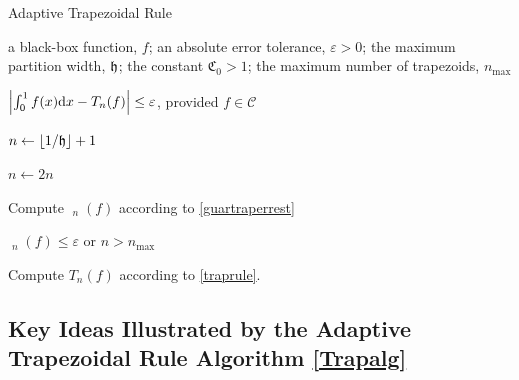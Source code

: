 \documentclass[11pt]{NSFamsart}
\newcommand{\hcut}{\frak{h}}
\DeclareMathOperator{\err}{err}
\DeclareMathOperator{\herr}{\widehat{\err}}
\def\dif{\textup{d}}
\newcommand{\cc}{\mathcal{C}}
\newcommand{\fC}{\mathfrak{C}}
\def\abs#1{\ensuremath{\left \lvert #1 \right \rvert}}
\begin{document}
\begin{algorithm}
	\caption{Adaptive Trapezoidal Rule \label{Trapalg}} 
	\begin{algorithmic}[1]
		\REQUIRE a black-box function, $f$; an absolute error tolerance,
		$\varepsilon>0$; the maximum partition width, $\hcut$; the constant $\fC_0 > 1$;  the 
		maximum number of trapezoids, $n_{\max}$

\ENSURE $\abs{\int_0^1 f(x) \dif x - T_n(f)} \le \varepsilon$, provided $f \in \cc$

\STATE $n \leftarrow \lfloor 1 /\hcut \rfloor + 1$

\REPEAT

\STATE $n \leftarrow 2n$

\STATE Compute $\herr_n(f)$ according to \eqref{guartraperrest}

\UNTIL  $\herr_n(f) \le \varepsilon$ or $n > n_{\max}$

\STATE Compute $T_n(f)$ according to \eqref{traprule}.
		
\end{algorithmic}
	\end{algorithm}


\subsection{Key Ideas Illustrated by the Adaptive Trapezoidal Rule Algorithm 
\ref{Trapalg}} 
\label{subsect:trap}
\end{document}
